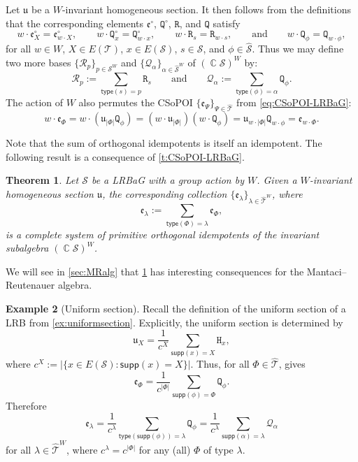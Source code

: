 \documentclass[11pt, oneside, reqno]{amsart}
\newtheorem{theorem}{Theorem}[section]
\theoremstyle{definition}
\newtheorem{example}[theorem]{Example}
\numberwithin{equation}{section}
\DeclareMathOperator{\C}{\mathbb{C}}
\def \SS{{\mathcal{S}}}
\def \TT{{\mathcal{T}}}
\def \kk{\C}
\def \uu{{\mathfrak{u}}}
\def \ee{{\mathfrak{e}}}
\def \wh{\widehat}
\def\qqand{\qquad\text{and}\qquad}
\def \supp{\mathsf{supp}}
\def \type{\mathsf{type}}
\newcommand{\B}[1]{\mathtt{#1}} 			%
\newcommand{\SB}[1]{\mathcal{#1}} 		%
\newcommand{\abs}[1]{|{#1}|} 				%
\begin{document}
Let $\uu$ be a $W$-invariant homogeneous section.
It then follows from the definitions that the corresponding elements $\ee^\circ$, $\B{Q}^\circ$, $\B{R}$, and $\B{Q}$ satisfy
\begin{equation}
    w \cdot \ee^\circ_X = \ee^\circ_{w \cdot X},
    \qquad
    w \cdot \B{Q}^\circ_x = \B{Q}^\circ_{w \cdot x},
    \qquad
    w \cdot \B{R}_s = \B{R}_{w \cdot s},
    \qqand
    w \cdot \B{Q}_\phi = \B{Q}_{w \cdot \phi},
\end{equation}
for all $w \in W$, $X \in E(\TT)$, $x \in E(\SS)$, $s \in \SS$, and $\phi \in \wh{\SS}$.
Thus we may define two more bases $\{ \SB{R}_p \}_{p \in \SS^W}$ and $\{ \SB{Q}_\alpha \}_{\alpha \in \wh{\SS}^W}$ of $(\kk \SS)^W$ by:
\[
    \SB{R}_p := \sum_{\type(s) = p} \B{R}_s
    \qqand
    \SB{Q}_\alpha := \sum_{\type(\phi) = \alpha} \B{Q}_\phi.
\]
The action of $W$ also permutes the CSoPOI $\{ \ee_\Psi \}_{\Psi \in \wh{\TT}}$ from \cref{eq:CSoPOI-LRBaG}:
\[
    w \cdot \ee_\Phi =
    w \cdot (\uu_{\abs{\Phi}} \B{Q}_\phi) = 
    (w \cdot  \uu_{\abs{\Phi}}) (w \cdot \B{Q}_\phi) = 
    \uu_{w \cdot\abs{\Phi}} \B{Q}_{w \cdot \phi} =
    \ee_{w \cdot \Phi}.
\]

Note that the sum of orthogonal idempotents is itself an idempotent. The following result is a consequence of \cref{t:CSoPOI-LRBaG}.

\begin{theorem}\label{thm:CSoPOI-invar-subalg}
    Let $\SS$ be a LRBaG with a group action by $W$. Given a $W$-invariant homogeneous section $\uu$, the corresponding collection 
    $\{ \ee_\lambda \}_{\lambda \in \wh{\TT}^W}$, where
    \begin{equation}\label{eq:CSoPOI-invariant}
        \ee_\lambda := \sum_{\type(\Phi) = \lambda} \ee_\Phi,
    \end{equation}
    is a complete system of primitive orthogonal idempotents of the invariant subalgebra $(\kk \SS)^W$.
\end{theorem}

We will see in \cref{sec:MRalg} that \cref{thm:CSoPOI-invar-subalg} has interesting consequences for the Mantaci--Reutenauer algebra. 

\begin{example}[Uniform section]\label{ex:uniform-general}
    Recall the definition of the uniform section of a LRB from \cref{ex:uniformsection}.
    Explicitly, the uniform section is determined by
    \[
        \uu_X = \dfrac{1}{c^X} \sum_{\supp(x) = X} \B{H}_x,
    \]
    where $c^X := |\{ x \in E(\SS) : \supp(x) = X \}|$.
    Thus, for all $\Phi \in \wh{\TT}$,  gives
    \[
        \ee_\Phi = \dfrac{1}{c^{\abs{\Phi}}} \sum_{\supp(\phi) = \Phi} \B{Q}_\phi.
    \]
   Therefore
    \[
        \ee_\lambda = \dfrac{1}{c^\lambda} \sum_{\type(\supp(\phi)) = \lambda} \B{Q}_\phi = \dfrac{1}{c^\lambda} \sum_{\supp(\alpha) = \lambda} \SB{Q}_\alpha
    \]
    for all $\lambda \in \wh{\TT}^W$, where $c^\lambda = c^{\abs{\Phi}}$ for any (all) $\Phi$ of type $\lambda$.
\end{example}
\end{document}
